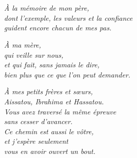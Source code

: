 \chapter*{}
\thispagestyle{empty}

\vspace*{\fill}

\begin{flushright}
\textit{À la mémoire de mon père,\\
dont l'exemple, les valeurs et la confiance\\
guident encore chacun de mes pas.}

\vspace{1.5em}

\textit{À ma mère,\\
qui veille sur nous,\\
et qui fait, sans jamais le dire,\\
bien plus que ce que l'on peut demander.}

\vspace{1.5em}

\textit{À mes petits frères et sœurs,\\
Aissatou, Ibrahima et Hassatou.\\
Vous avez traversé la même épreuve\\
sans cesser d'avancer.\\
Ce chemin est aussi le vôtre,\\
et j'espère seulement\\
vous en avoir ouvert un bout.}
\end{flushright}

\vspace*{\fill}
